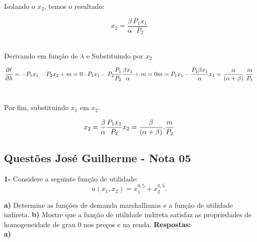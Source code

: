 \begin{flushleft}
	\begin{center}
	Isolando o $x_{2}$, temos o resultado:
	\end{center}

	\begin{equation}
		x_{2} = \dfrac{\beta}{\alpha}\dfrac{P_{1}x_{1}}{P_{2}}
	\end{equation}
\\

	\begin{center}
		Derivando em função de $\lambda$ e Substituindo por $x_{2}$ \\
	\end{center}

	\begin{equation}
		\frac{\partial\ell}{\partial \lambda} = -P_{1}x_{1} - P_{2}x_{2} + m = 0 
		$$\\$$
		-P_{1}x_{1} - P_{2}\dfrac{P_{1}}{P_{2}}\dfrac{\beta x_{1}}{\alpha} + m = 0
		$$\\$$
		m = P_{1}x_{1} - \dfrac{P_{1}{\beta x_{1}}}{\alpha} 
		$$\\$$
		x_{1} = \dfrac{\alpha}{(\alpha + \beta)}.\dfrac{m}{P_{1}}
	\end{equation}
	\\
	\begin{center}
		Por fim, substituindo $x_{1}$ em $x_{2}$.
	\end{center}

	\begin{equation}
		x_{2} = \dfrac{\beta}{\alpha}\dfrac{P_{1}x_{1}}{P_{2}}
		$$\\$$
		x_{2} = \dfrac{\beta}{(\alpha + \beta)}.\dfrac{m}{P_{2}}
	\end{equation}
\singlespacing

\begin{center}
	\section*{Questões José Guilherme - Nota 05}
\end{center}
\singlespacing
\textbf{1-} Considere a seguinte função de utilidade:
\\

	$$u(x_{1},x_{2}) = x_{1}^{0,5} + x_{2}^{0,5}.$$

\textbf{a)} Determine as funções de demanda marshallianas e a função de utilidade indireta.
\singlespacing
\textbf{b)} Mostre que a função de utilidade indireta satisfaz as propriedades de homogeneidade de grau 0 nos preços e na renda.
\singlespacing
\textbf{Respostas:}
\\
\textbf{a)}
\singlespacing


\end{flushleft}
